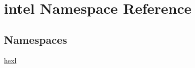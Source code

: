 \hypertarget{namespaceintel}{}\section{intel Namespace Reference}
\label{namespaceintel}
\subsection*{Namespaces}
\begin{DoxyCompactItemize}
\item 
 \hyperlink{namespaceintel_1_1hexl}{hexl}
\end{DoxyCompactItemize}
